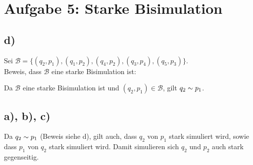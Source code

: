 \section*{Aufgabe 5: Starke Bisimulation}

\subsection*{d)}

Sei $\mathcal{B} = \{(q_2, p_1),(q_1, p_2),(q_4,p_2),(q_3,p_4),(q_5,p_3)\}$. \\
Beweis, dass $\mathcal{B} $ eine starke Bisimulation ist:

\begin{compactitem}
\item {}
\item {}
\item {}
\item {}
\end{compactitem}

Da $\mathcal{B}$ eine starke Bisimulation ist und $(q_2, p_1) \in \mathcal{B}$, gilt $q_2 \sim p_1$.
\subsection*{a), b), c)}
Da $q_2 \sim p_1$ (Beweis siehe d), gilt auch, dass $ q_2$ von $  p_1$ stark simuliert wird, sowie dass $p_1 $ von $ q_2$ stark simuliert wird. Damit simulieren sich $q_2$ und $p_2$ auch stark gegenseitig.
